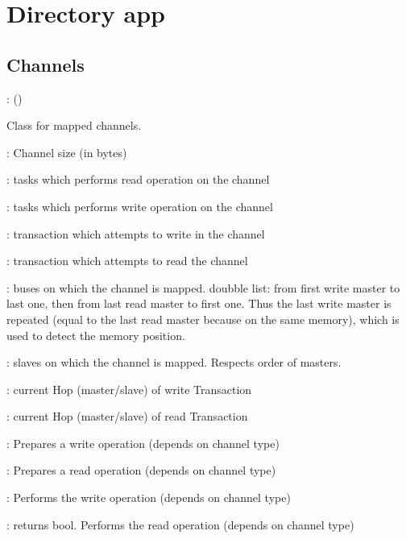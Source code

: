 \documentclass[a4paper,11pt]{article}
\newcommand{\bfont}{\fontseries{b}\selectfont}
\newcommand{\cod}[1]{{\ttfamily #1}}
\newcommand{\class}[2]{\par\vspace{1mm}\hspace{-5mm}\large\colorbox{file}{\textbullet\bfont\cod{#1}:} (\cod{#2})\par}
\newcommand{\method}[1]{\par\vspace{1mm}\hspace{-2mm}\colorbox{method}{\textopenbullet\bfont\cod{#1}:}}
\newcommand{\variable}[1]{\par\vspace{1mm}\hspace{-2mm}\colorbox{variable}{\textopenbullet\bfont\cod{#1}:}}
\begin{document}
\section*{Directory \cod{app}}

\subsection*{Channels}
\class{TMLChannel}{}
Class for mapped channels.
\variable{\_width} Channel size (in bytes)

\variable{\_readTask} tasks which performs read operation on the channel

\variable{\_writeTask} tasks which performs write operation on the channel

\variable{\_writeTrans} transaction which attempts to write in the channel

\variable{\_readTrans} transaction which attempts to read the channel

\variable{\_masters} buses on which the channel is mapped. doubble list: from first write master to last one, then from last read master to first one. Thus the last write master is repeated (equal to the last read master because on the same memory), which is used to detect the memory position.

\variable{\_slaves} slaves on which the channel is mapped. Respects order of masters.

\variable{\_writeTransCurrHop} current Hop (master/slave) of write Transaction
	
\variable{\_readTransCurrHop} current Hop (master/slave) of read Transaction
	
\method{testWrite(iTrans)} Prepares a write operation (depends on channel type)

\method{testRead(iTrans)} Prepares a read operation (depends on channel type)

\method{write()} Performs the write operation (depends on channel type)

\method{read()} returns bool. Performs the read operation (depends on channel type)
\end{document}
